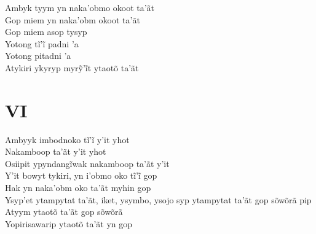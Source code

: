 \begin{linenumbers}\begingroup\raggedright
 
\noindent   Ambyk tyym yn naka'obmo okoot ta'ãt\\
  Gop miem yn naka'obm okoot ta'ãt\\
  Gop miem asop tysyp\\
  Yotong tĩ’ĩ padni ’a\\
  Yotong pitadni 'a\\
  Atykiri ykyryp myrỹ’ĩt ytaotõ ta’ãt
 
 
 \medskip
\section{VI}

  \noindent Ambyyk imbodnoko tĩ’ĩ y’it yhot\\
  Nakamboop ta'ãt y'it yhot\\
  Osiipit ypyndangĩwak nakamboop ta’ãt y’it\\
  Y’it bowyt tykiri, yn i’obmo oko tĩ’ĩ gop\\
  Hak yn naka'obm oko ta'ãt myhin gop\\
  Ysyp'et ytampytat ta'ãt, iket, ysymbo, ysojo syp ytampytat ta'ãt gop sõwõrã pip\\
  Atyym ytaotõ ta'ãt gop sõwõrã\\
  Yopirisawarip ytaotõ ta'ãt yn gop
 
\end{linenumbers}\endgroup

